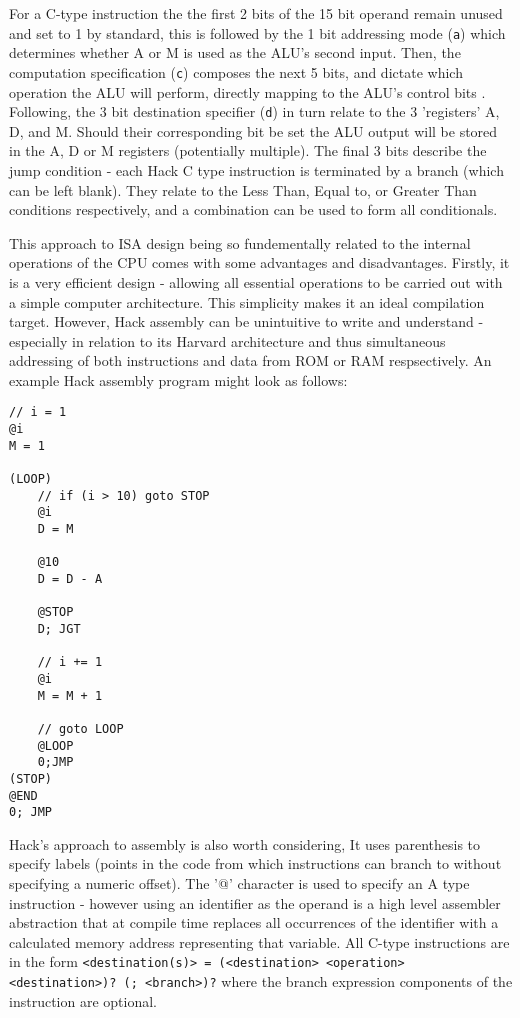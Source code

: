 For a C-type instruction the the first 2 bits of the 15 bit operand remain unused and set to 1 by standard, this is followed by the 1 bit addressing mode (\texttt{a}) which determines whether A or M is used as the ALU's second input. Then, the computation specification (\texttt{c}) composes the next 5 bits, and dictate which operation the ALU will perform, directly mapping to the ALU's control bits \textcite{EOCS}. Following, the 3 bit destination specifier (\texttt{d}) in turn relate to the 3 'registers' A, D, and M. Should their corresponding bit be set the ALU output will be stored in the A, D or M registers (potentially multiple). The final 3 bits describe the jump condition - each Hack C type instruction is terminated by a branch (which can be left blank). They relate to the Less Than, Equal to, or Greater Than conditions respectively, and a combination can be used to form all conditionals.

\bigskip


\bigskip

This approach to ISA design being so fundementally related to the internal operations of the CPU comes with some advantages and disadvantages. Firstly, it is a very efficient design - allowing all essential operations to be carried out with a simple computer architecture. This simplicity makes it an ideal compilation target. However, Hack assembly can be unintuitive to write and understand - especially in relation to its Harvard architecture and thus simultaneous addressing of both instructions and data from ROM or RAM respsectively. An example Hack assembly program might look as follows:
\begin{lstlisting}
// i = 1
@i
M = 1

(LOOP)
    // if (i > 10) goto STOP
    @i 
    D = M

    @10
    D = D - A

    @STOP
    D; JGT

    // i += 1
    @i
    M = M + 1

    // goto LOOP
    @LOOP
    0;JMP
(STOP)
@END
0; JMP
\end{lstlisting}

Hack's approach to assembly is also worth considering, It uses parenthesis to specify labels (points in the code from which instructions can branch to without specifying a numeric offset). The '@' character is used to specify an A type instruction - however using an identifier as the operand is a high level assembler abstraction that at compile time replaces all occurrences of the identifier with a calculated memory address representing that variable. All C-type instructions are in the form \texttt{<destination(s)> = (<destination> <operation> <destination>)? (; <branch>)?} where the branch expression components of the instruction are optional. 

